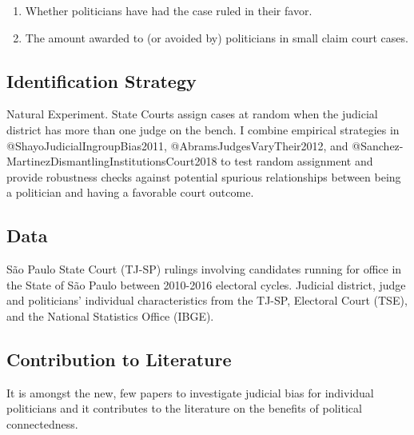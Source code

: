 \documentclass[]{article}
\begin{document}
\begin{enumerate}
\item
  Whether politicians have had the case ruled in their favor.
\item
  The amount awarded to (or avoided by) politicians in small claim court
  cases.
\end{enumerate}

\hypertarget{identification-strategy}{%
\subsection{Identification Strategy}\label{identification-strategy}}

Natural Experiment. State Courts assign cases at random when the
judicial district has more than one judge on the bench. I combine
empirical strategies in @ShayoJudicialIngroupBias2011,
@AbramsJudgesVaryTheir2012, and
@Sanchez-MartinezDismantlingInstitutionsCourt2018 to test random
assignment and provide robustness checks against potential spurious
relationships between being a politician and having a favorable court
outcome.

\hypertarget{data}{%
\subsection{Data}\label{data}}

São Paulo State Court (TJ-SP) rulings involving candidates running for
office in the State of São Paulo between 2010-2016 electoral cycles.
Judicial district, judge and politicians' individual characteristics
from the TJ-SP, Electoral Court (TSE), and the National Statistics
Office (IBGE).

\hypertarget{contribution-to-literature}{%
\subsection{Contribution to
Literature}\label{contribution-to-literature}}

It is amongst the new, few papers to investigate judicial bias for
individual politicians and it contributes to the literature on the
benefits of political connectedness.
\end{document}
